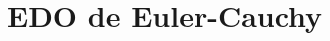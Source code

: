 \documentclass[../2024-EDO.tex]{subfiles}
\begin{document}
\section{EDO de Euler-Cauchy}
\end{document}
